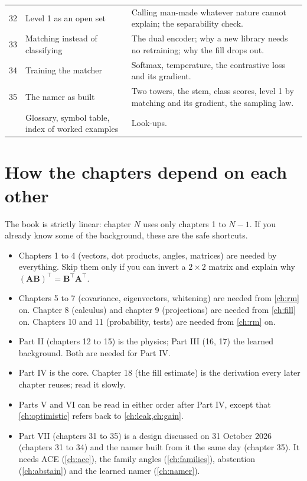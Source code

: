 \documentclass[11pt,a4paper,oneside,openany]{book}
\newcommand{\B}[1]{{\symbf{#1}}}
\newcommand{\B}[1]{{\bm{#1}}}
\newcommand{\T}{^{\top}}
\newcommand{\mA}{\B{A}}
\newcommand{\mB}{\B{B}}
\begin{document}
{\begin{longtable}{@{}p{}p{}p{}@{}}
32 & Level 1 as an open set & Calling man-made whatever nature cannot explain; the separability check.\\
33 & Matching instead of classifying & The dual encoder; why a new library needs no retraining; why the fill drops out.\\
34 & Training the matcher & Softmax, temperature, the contrastive loss and its gradient.\\
35 & The namer as built & Two towers, the stem, class scores, level 1 by matching and its gradient, the sampling law.\\
\midrule
& Glossary, symbol table, index of worked examples & Look-ups.\\
\bottomrule
\end{longtable}}

\section*{How the chapters depend on each other}

The book is strictly linear: chapter $N$ uses only chapters 1 to $N-1$. If you already know some of the background, these are the safe
shortcuts.
\begin{itemize}
\item Chapters 1 to 4 (vectors, dot products, angles, matrices) are needed by everything. Skip them only if you can invert a $2\times2$ matrix and
  explain why $(\mA\mB)\T=\mB\T\mA\T$.
\item Chapters 5 to 7 (covariance, eigenvectors, whitening) are needed from \cref{ch:rm} on. Chapter 8 (calculus) and chapter 9 (projections)
  are needed from \cref{ch:fill} on. Chapters 10 and 11 (probability, tests) are needed from \cref{ch:rm} on.
\item Part II (chapters 12 to 15) is the physics; Part III (16, 17) the learned background. Both are needed for Part IV.
\item Part IV is the core. Chapter 18 (the fill estimate) is the derivation every later chapter reuses; read it slowly.
\item Parts V and VI can be read in either order after Part IV, except that \cref{ch:optimistic} refers back to \cref{ch:leak,ch:gain}.
\item Part VII (chapters 31 to 35) is a design discussed on 31 October 2026 (chapters 31 to 34) and the namer built from it the same day (chapter 35). It needs ACE (\cref{ch:ace}), the family angles (\cref{ch:families}),
  abstention (\cref{ch:abstain}) and the learned namer (\cref{ch:namer}).
\end{itemize}
\end{document}

